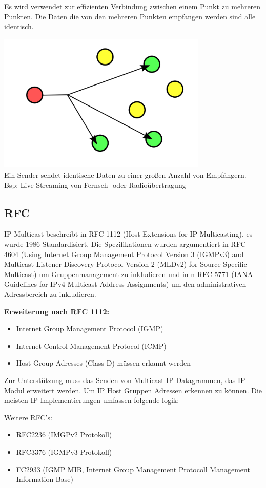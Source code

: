 \documentclass[12pt, a4paper]{article}
\begin{document}
		Es wird verwendet zur effizienten Verbindung zwischen einem Punkt zu mehreren Punkten. Die Daten die von den mehreren Punkten empfangen werden sind alle identisch.

	\includegraphics[width=10cm]{multicast.png}\\
	
	Ein Sender sendet identische Daten zu einer großen Anzahl von Empfängern. 
	Bsp: 
	Live-Streaming von Fernseh- oder Radioübertragung

	\subsection*{RFC}
	IP Multicast beschreibt in RFC 1112 (Host Extensions for IP Multicasting), es wurde 1986 Standardisiert.
	Die Spezifikationen wurden argumentiert in RFC 4604 (Using Internet Group Management Protocol Version 3 (IGMPv3) and Multicast Listener Discovery Protocol Version 2 (MLDv2) for Source-Specific Multicast) um Gruppenmanagement zu inkludieren und in n RFC 5771 (IANA Guidelines for IPv4 Multicast Address Assignments) um den administrativen Adressbereich zu inkludieren. 

	\textbf{Erweiterung nach RFC 1112:}
	\begin{itemize}
		\item  	Internet Group Management Protocol (IGMP)	
		\item 	Internet Control Management Protocol (ICMP)
		\item  	Host Group Adresses (Class D) müssen erkannt werden
	\end{itemize}
	
	Zur Unterstützung muss das Senden von Multicast IP Datagrammen, das IP Modul erweitert werden. Um IP Host Gruppen Adressen erkennen zu können. 
	Die meisten IP Implementierungen umfassen folgende logik:

	Weitere RFC's:
	\begin{itemize}
	\item  	RFC2236 (IMGPv2 Protokoll)
	\item	RFC3376 (IGMPv3 Protokoll)
	\item 	FC2933 (IGMP MIB, Internet Group Management Protocoll Management Information Base)
	\end{itemize}
	
\end{document}
